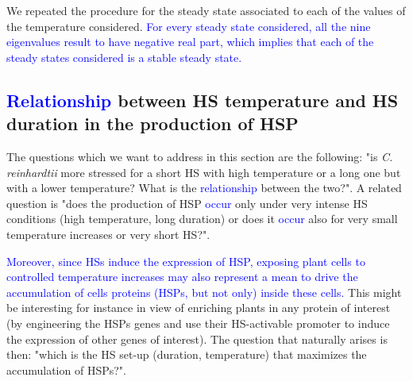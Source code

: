 \documentclass[oneside, 10pt, a4paper, twocolumn]{article}
\begin{document}
We repeated the procedure for the steady state associated to each of the values of the temperature considered.
\textcolor{blue}{For every steady state considered, all the nine eigenvalues result to have negative real part, which implies that each of the steady states considered is a stable steady state.}







\subsection{\textcolor{blue}{Relationship} between HS temperature and HS duration in the production of HSP}
\label{SecTradeOff}



The questions which we want to address in this section  
are the following: "is \emph{C. reinhardtii} more stressed for a short HS with high temperature or a long one but with a lower temperature? What is the \textcolor{blue}{relationship} between the two?". A related question is "does the production of HSP \textcolor{blue}{occur} only under very intense HS conditions (high temperature, long duration) or does it \textcolor{blue}{occur} also for very small temperature increases or very short HS?". 

\textcolor{blue}{Moreover, since HSs induce the expression of HSP, exposing plant cells to controlled temperature increases may also represent a mean to drive the accumulation of cells proteins (HSPs, but not only) inside these cells.} This might be interesting for instance in view of enriching plants in any protein of interest (by engineering the HSPs genes and use their HS-activable promoter to induce the expression of other genes of interest). 
The question that naturally arises is then: "which is the HS set-up (duration, temperature) that maximizes the accumulation of HSPs?".
\end{document}
